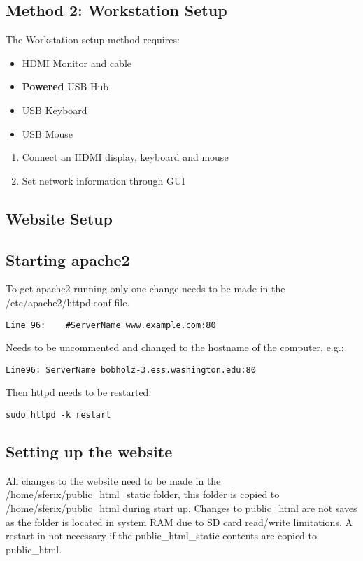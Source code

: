 \documentclass[12pt, letterpaper, onecolumn, oneside]{article}
\begin{document}
\subsection*{Method 2: Workstation Setup}
The Workstation setup method requires:
\begin{itemize}
\item{HDMI Monitor and cable}
\item{{\bf Powered} USB Hub}
\item{USB Keyboard}
\item{USB Mouse}
\end{itemize}

\begin{enumerate}
\item{Connect an HDMI display, keyboard and mouse}
\item{Set network information through GUI}
\end{enumerate}

\begin{centering}
\section*{Website Setup}
\end{centering}

\subsection*{Starting apache2}

To get apache2 running only one change needs to be made in the /etc/apache2/httpd.conf file.

\begin{verbatim}
Line 96:	#ServerName www.example.com:80
\end{verbatim}

Needs to be uncommented and changed to the hostname of the computer, e.g.:

\begin{verbatim}
Line96:	ServerName bobholz-3.ess.washington.edu:80
\end{verbatim}

Then httpd needs to be restarted:

\begin{verbatim}
sudo httpd -k restart
\end{verbatim}

\subsection*{Setting up the website}

All changes to the website need to be made in the /home/sferix/public\_html\_static folder, this folder is copied to /home/sferix/public\_html during start up. Changes to public\_html are not saves as the folder is located in system RAM due to SD card read/write limitations. A restart in not necessary if the public\_html\_static contents are copied to public\_html.






%
%
\end{document}
